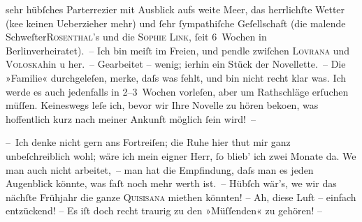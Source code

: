                     sehr hübſches Parterrezi{\geminationm}er mit Ausblick aufs weite
                    Meer, das herrlichſte Wetter (ke{\geminationn}e keinen
                    Ueberzieher mehr) und{ }ſehr{ }ſympathiſche Geſellschaft (die malende Schweſter\textsc{Rosenthal}’s und die \textsc{Sophie Link},{ }ſeit 6 Wochen in Berlinverheiratet). – Ich
                    bin meiſt im Freien, und pendle zwiſchen \textsc{Lovrana} und \textsc{Voloska}hin u her. – Gearbeitet – wenig; i{\geminationm}erhin ein Stück der Novellette. – Die »Familie« durchgeleſen, merke, daſs was
                    fehlt, und bin nicht recht klar was. Ich werde es auch jedenfalls in 2–3 Wochen
                    vorleſen, aber um Rathschläge erſuchen müſſen. Keineswegs leſe ich, bevor wir
                    Ihre Novelle zu hören
                    beko{\geminationm}en, was hoffentlich kurz nach meiner Ankunft
                    möglich{ }ſein wird! –\pend
           
\pstart
           – Ich denke nicht gern ans Fortreiſen; die Ruhe hier thut mir ganz
                    unbeſchreiblich wohl; wäre ich mein eigner Herr,{ }ſo blieb’ ich zwei Monate da.
                    We{\geminationn} man auch nicht {\pb}arbeitet, – man hat die Empfindung, daſs man es jeden Augenblick könnte, was
                    faſt noch mehr werth ist. – Hübſch wär’s, we{\geminationn} wir
                    das nächſte Frühjahr die ganze \textsc{Quisisana} miethen könnten! – Ah, diese Luft – einfach entzückend! – Es iſt doch
                    recht traurig zu den »Müſſenden« zu gehören! –\pend
           
